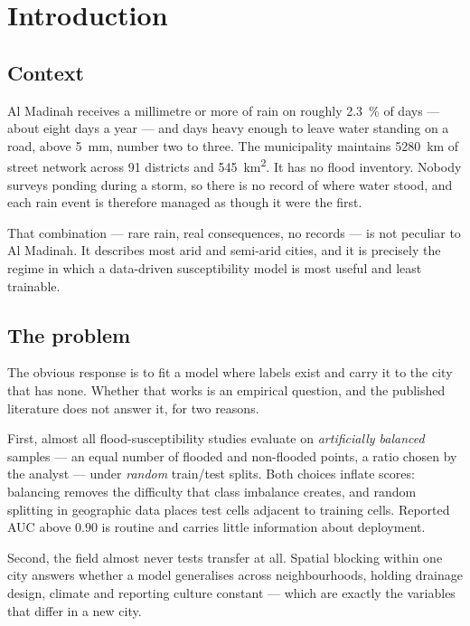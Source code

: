 \documentclass[11pt]{article}
\begin{document}
\section{Introduction}

\subsection{Context}
Al Madinah receives a millimetre or more of rain on roughly \SI{2.3}{\percent} of
days --- about eight days a year --- and days heavy enough to leave water
standing on a road, above \SI{5}{\milli\metre}, number two to three. The
municipality maintains \SI{5280}{\kilo\metre} of street network across
\num{91} districts and \SI{545}{\kilo\metre\squared}. It has no flood inventory.
Nobody surveys ponding during a storm, so there is no record of where water
stood, and each rain event is therefore managed as though it were the first.

That combination --- rare rain, real consequences, no records --- is not
peculiar to Al Madinah. It describes most arid and semi-arid cities, and it is
precisely the regime in which a data-driven susceptibility model is most useful
and least trainable.

\subsection{The problem}
The obvious response is to fit a model where labels exist and carry it to the
city that has none. Whether that works is an empirical question, and the
published literature does not answer it, for two reasons.

First, almost all flood-susceptibility studies evaluate on \emph{artificially
balanced} samples --- an equal number of flooded and non-flooded points, a ratio
chosen by the analyst --- under \emph{random} train/test splits. Both choices
inflate scores: balancing removes the difficulty that class imbalance creates,
and random splitting in geographic data places test cells adjacent to training
cells. Reported AUC above $0.90$ is routine and carries little information about
deployment.

Second, the field almost never tests transfer at all. Spatial blocking within one
city answers whether a model generalises across neighbourhoods, holding drainage
design, climate and reporting culture constant --- which are exactly the
variables that differ in a new city.
\end{document}
